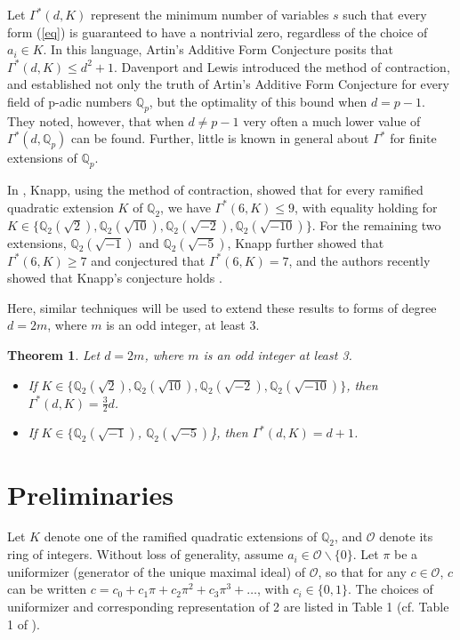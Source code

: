 \documentclass[12pt]{amsart}
\newtheorem{theorem}{Theorem}
\begin{document}
Let $\Gamma^*(d, K)$ represent the minimum number of variables $s$ such that every form (\ref{eq}) is guaranteed to have a nontrivial zero, regardless of the choice of $a_i \in K$.  In this language, Artin's Additive Form Conjecture posits that $\Gamma^*(d, K) \le d^2+1$. Davenport and Lewis \cite{davenport1963homogeneous} introduced the method of contraction, and established not only the truth of Artin's Additive Form Conjecture for every field of p-adic numbers $\mathbb{Q}_p$, but the optimality of this bound when $d=p-1$.  They noted, however, that when $d \ne p-1$ very often a much lower value of $\Gamma^*(d, \mathbb{Q}_p)$ can be found.  Further, little is known in general about $\Gamma^*$ for finite extensions of $\mathbb{Q}_p$.

In \cite{knapp2016solubility}, Knapp, using the method of contraction, showed that for every ramified quadratic extension $K$ of $\mathbb{Q}_2$, we have $\Gamma^*(6,K) \le 9$, with equality holding for $K \in \{\mathbb{Q}_2(\sqrt{2}), \mathbb{Q}_2(\sqrt{10}), \mathbb{Q}_2(\sqrt{-2}), \mathbb{Q}_2(\sqrt{-10})\}$.  For the remaining two extensions, $\mathbb{Q}_2(\sqrt{-1})$ and $\mathbb{Q}_2(\sqrt{-5})$, Knapp further showed that $\Gamma^*(6,K) \ge 7$ and conjectured that $\Gamma^*(6,K) = 7$, and the authors recently showed that Knapp's conjecture holds \cite{2020arXiv200509770D}.

Here, similar techniques will be used to extend these results to forms of degree $d=2m$, where $m$ is an odd integer, at least 3.

\begin{theorem} \label{theo}
Let $d=2m$, where $m$ is an odd integer at least 3.
\begin{itemize}
    \item If $K \in \{\mathbb{Q}_2(\sqrt{2}), \mathbb{Q}_2(\sqrt{10}), \mathbb{Q}_2(\sqrt{-2}), \mathbb{Q}_2(\sqrt{-10})\}$, then $\Gamma^*(d,K) = \frac{3}{2}d$.
    \item If $K \in  \{\mathbb{Q}_2(\sqrt{-1})$, $\mathbb{Q}_2(\sqrt{-5})$\}, then $\Gamma^*(d,K) = d+1$.
\end{itemize}
\end{theorem}

\section{Preliminaries}

Let $K$ denote one of the ramified quadratic extensions of $\mathbb{Q}_2$, and $\mathcal{O}$ denote its ring of integers.  Without loss of generality, assume $a_i \in \mathcal{O}\backslash\{0\}$.  Let $\pi$ be a uniformizer (generator of the unique maximal ideal) of $\mathcal{O}$, so that for any $c \in \mathcal{O}$, $c$ can be written $c = c_0 + c_1\pi + c_2\pi^2 + c_3\pi^3 + \ldots$, with $c_i \in \{0,1\}$.  The choices of uniformizer and corresponding representation of 2 are listed in Table 1 (cf. Table 1 of \cite{knapp2016solubility}).
\end{document}
